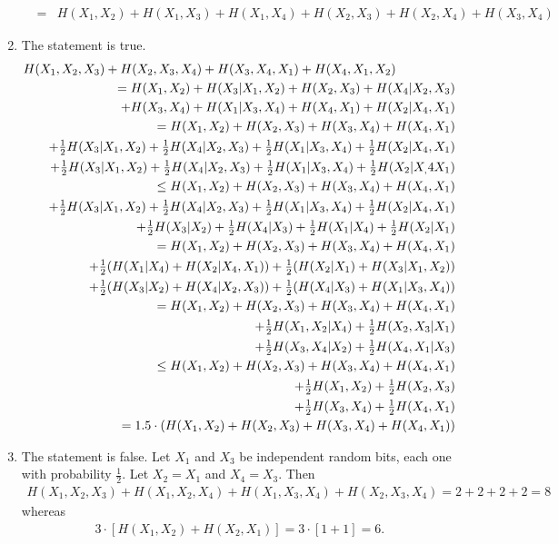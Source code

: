 \documentclass[11pt]{article} \usepackage{amssymb}
\newcommand{\half}{{\textstyle \frac12}}
\begin{document}
\begin{enumerate}
\begin{eqnarray*}
&=&H(X_1,X_2)+H(X_1,X_3)+H(X_1,X_4)+H(X_2,X_3)+H(X_2,X_4)+H(X_3,X_4) 
  \end{eqnarray*}
\item
The statement is true.
  \begin{eqnarray*}
    \lefteqn{H(X_1,X_2,X_3)+H(X_2,X_3,X_4)+H(X_3,X_4,X_1)+H(X_4,X_1,X_2)}\\
&&= H(X_1,X_2)+H(X_3|X_1,X_2)+H(X_2,X_3)+H(X_4|X_2,X_3)\\
&&\quad+H(X_3,X_4)+H(X_1|X_3,X_4)+H(X_4,X_1)+H(X_2|X_4,X_1)\\
&&= H(X_1,X_2)+H(X_2,X_3)+H(X_3,X_4)+H(X_4,X_1)\\
&&\quad+\half H(X_3|X_1,X_2)+\half H(X_4|X_2,X_3)+\half H(X_1|X_3,X_4)+\half H(X_2|X_4,X_1)\\
&&\quad+\half H(X_3|X_1,X_2)+\half H(X_4|X_2,X_3)+\half H(X_1|X_3,X_4)+\half H(X_2|X_,4X_1)\\
&&\leq H(X_1,X_2)+H(X_2,X_3)+H(X_3,X_4)+H(X_4,X_1)\\
&&\quad+\half H(X_3|X_1,X_2)+\half H(X_4|X_2,X_3)+\half H(X_1|X_3,X_4)+\half H(X_2|X_4,X_1)\\
&&\quad+\half H(X_3|X_2)+\half H(X_4|X_3)+\half H(X_1|X_4)+\half H(X_2|X_1)\\
&&= H(X_1,X_2)+H(X_2,X_3)+H(X_3,X_4)+H(X_4,X_1)\\
&&\quad+\half (H(X_1|X_4)+H(X_2|X_4,X_1))+\half (H(X_2|X_1)+H(X_3|X_1,X_2))\\
&&\quad+\half (H(X_3|X_2)+H(X_4|X_2,X_3))+\half (H(X_4|X_3)+H(X_1|X_3,X_4))\\
&&= H(X_1,X_2)+H(X_2,X_3)+H(X_3,X_4)+H(X_4,X_1)\\
&&\quad+\half H(X_1,X_2|X_4)+\half H(X_2,X_3|X_1)\\
&&\quad+\half H(X_3,X_4|X_2)+\half H(X_4,X_1|X_3)\\
&&\leq H(X_1,X_2)+H(X_2,X_3)+H(X_3,X_4)+H(X_4,X_1)\\
&&\quad+\half H(X_1,X_2)+\half H(X_2,X_3)\\
&&\quad+\half H(X_3,X_4)+\half H(X_4,X_1)\\
&&= 1.5\cdot\left(H(X_1,X_2)+H(X_2,X_3)+H(X_3,X_4)+H(X_4,X_1)\right)
\end{eqnarray*}
\item
The statement is false. Let $X_1$ and $X_3$ be independent random bits,
each one with probability $\half$. Let $X_2=X_1$ and $X_4=X_3$. Then
\begin{eqnarray*}
  H(X_1,X_2,X_3)+H(X_1,X_2,X_4)+H(X_1,X_3,X_4)+H(X_2,X_3,X_4) = 2 + 2 + 2 + 2=8
\end{eqnarray*}
whereas
\begin{eqnarray*}
  3\cdot[H(X_1,X_2)+H(X_2,X_1)]=3\cdot[1+1] = 6.
\end{eqnarray*}
\end{enumerate}
\end{document}
